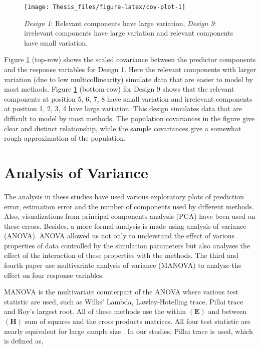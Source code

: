\documentclass[11pt,twoside,openright,titlepage,
  headinclude,footinclude,BCOR=5mm,
  numbers=noenddot,cleardoublepage=empty,
  tablecaptionabove, dottedtoc,
  bibliography=totoc,paper=a4]{scrreprt}
\begin{document}
\begin{figure}[!htb]
\texttt{[image: Thesis\_files/figure-latex/cov-plot-1]} \caption{\emph{Design 1}: Relevant components have large variation, \emph{Design 9}: irrelevant components have large variation and relevant components have small variation.}\label{fig:cov-plot}
\end{figure}

Figure \ref{fig:cov-plot} (top-row) shows the scaled covariance between the predictor components and the response variables for Design 1. Here the relevant components with larger variation (due to low multicollinearity) simulate data that are easier to model by most methods. Figure \ref{fig:cov-plot} (bottom-row) for Design 9 shows that the relevant components at position 5, 6, 7, 8 have small variation and irrelevant components at position 1, 2, 3, 4 have large variation. This design simulates data that are difficult to model by most methods. The population covariances in the figure give clear and distinct relationship, while the sample covariances give a somewhat rough approximation of the population.

\hypertarget{analysis-of-variance}{%
\section{Analysis of Variance}\label{analysis-of-variance}}

The analysis in these studies have used various exploratory plots of prediction error, estimation error and the number of components used by different methods. Also, visualizations from principal components analysis (PCA) have been used on these errors. Besides, a more formal analysis is made using analysis of variance (ANOVA). ANOVA allowed us not only to understand the effect of various properties of data controlled by the simulation parameters but also analyses the effect of the interaction of these properties with the methods. The third and fourth paper use multivariate analysis of variance (MANOVA) to analyze the effect on four response variables.

MANOVA is the multivariate counterpart of the ANOVA where various test statistic are used, such as Wilks' Lambda, Lawley-Hotelling trace, Pillai trace and Roy's largest root. All of these methods use the within \((\mathbf{E})\) and between \((\mathbf{H})\) sum of squares and the cross products matrices. All four test statistic are nearly equivalent for large sample size \citep{johnson2018applied}. In our studies, Pillai trace is used, which is defined as,
\end{document}
